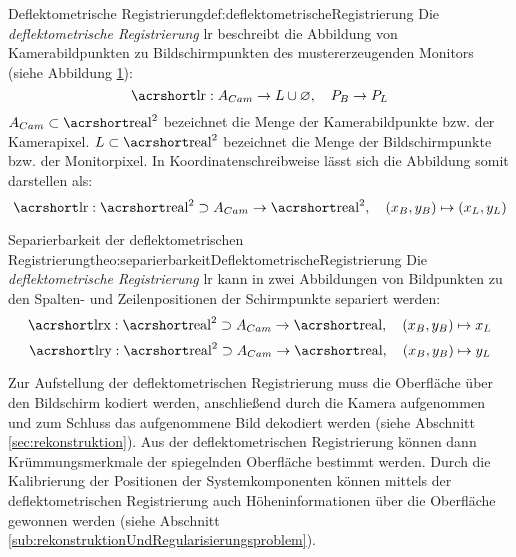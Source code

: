 %
\begin{Definition}{Deflektometrische Registrierung}{def:deflektometrischeRegistrierung}
	Die \textit{deflektometrische Registrierung} \acrshort{lr} beschreibt die Abbildung von Kamerabildpunkten zu Bildschirmpunkten des mustererzeugenden Monitors \cite{kit_werling} (siehe Abbildung \ref{tikz:abbAbbildungssystem}):
	\begin{equation*}
		\acrshortmath{lr} : A_{Cam} \rightarrow L \cup \varnothing ,\quad P_{B} \rightarrow P_{L}
	\end{equation*}
	$ A_{Cam} \subset \acrshortmath{real}^{2} $ bezeichnet die Menge der Kamerabildpunkte bzw. der Kamerapixel.
	$ L \subset \acrshortmath{real}^{2} $ bezeichnet die Menge der Bildschirmpunkte bzw. der Monitorpixel.
	In Koordinatenschreibweise lässt sich die Abbildung somit darstellen als:
	\begin{equation*}
		\acrshortmath{lr} : \acrshortmath{real}^{2} \supset A_{Cam} \rightarrow \acrshortmath{real}^2 ,\quad (x_{B}, y_{B}) \mapsto (x_{L}, y_{L})
	\end{equation*}
\end{Definition}
%
{
	\begin{figure}[H]
		\centering
		
		\label{tikz:abbAbbildungssystem}
	\end{figure}
}
%
\begin{Satz}{Separierbarkeit der deflektometrischen Registrierung}{theo:separierbarkeitDeflektometrischeRegistrierung}
Die \textit{deflektometrische Registrierung} \acrshort{lr} kann in zwei Abbildungen von Bildpunkten zu den Spalten- und Zeilenpositionen der Schirmpunkte separiert werden:
	\begin{equation*}
		\acrshortmath{lrx} : \acrshortmath{real}^{2} \supset A_{Cam} \rightarrow \acrshortmath{real} ,\quad (x_{B}, y_{B}) \mapsto x_{L}
	\end{equation*}
	\begin{equation*}
		\acrshortmath{lry} : \acrshortmath{real}^{2} \supset A_{Cam} \rightarrow \acrshortmath{real} ,\quad (x_{B}, y_{B}) \mapsto y_{L}
	\end{equation*}
\end{Satz}

\noindent
Zur Aufstellung der deflektometrischen Registrierung muss die Oberfläche über den Bildschirm kodiert werden, anschließend durch die Kamera aufgenommen und zum Schluss das aufgenommene Bild dekodiert werden (siehe Abschnitt \ref{sec:rekonstruktion}).
Aus der deflektometrischen Registrierung können dann Krümmungsmerkmale der spiegelnden Oberfläche bestimmt werden.
Durch die Kalibrierung der Positionen der Systemkomponenten können mittels der deflektometrischen Registrierung auch Höheninformationen über die Oberfläche gewonnen werden (siehe Abschnitt \ref{sub:rekonstruktionUndRegularisierungsproblem}).

